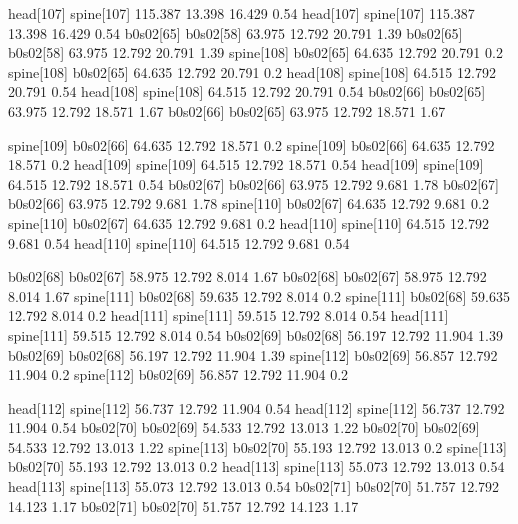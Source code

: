 head[107]    spine[107]    115.387    13.398    16.429    0.54
head[107]    spine[107]    115.387    13.398    16.429    0.54
b0s02[65]    b0s02[58]    63.975    12.792    20.791    1.39
b0s02[65]    b0s02[58]    63.975    12.792    20.791    1.39
spine[108]    b0s02[65]    64.635    12.792    20.791    0.2
spine[108]    b0s02[65]    64.635    12.792    20.791    0.2
head[108]    spine[108]    64.515    12.792    20.791    0.54
head[108]    spine[108]    64.515    12.792    20.791    0.54
b0s02[66]    b0s02[65]    63.975    12.792    18.571    1.67
b0s02[66]    b0s02[65]    63.975    12.792    18.571    1.67


spine[109]    b0s02[66]    64.635    12.792    18.571    0.2
spine[109]    b0s02[66]    64.635    12.792    18.571    0.2
head[109]    spine[109]    64.515    12.792    18.571    0.54
head[109]    spine[109]    64.515    12.792    18.571    0.54
b0s02[67]    b0s02[66]    63.975    12.792    9.681    1.78
b0s02[67]    b0s02[66]    63.975    12.792    9.681    1.78
spine[110]    b0s02[67]    64.635    12.792    9.681    0.2
spine[110]    b0s02[67]    64.635    12.792    9.681    0.2
head[110]    spine[110]    64.515    12.792    9.681    0.54
head[110]    spine[110]    64.515    12.792    9.681    0.54


b0s02[68]    b0s02[67]    58.975    12.792    8.014    1.67
b0s02[68]    b0s02[67]    58.975    12.792    8.014    1.67
spine[111]    b0s02[68]    59.635    12.792    8.014    0.2
spine[111]    b0s02[68]    59.635    12.792    8.014    0.2
head[111]    spine[111]    59.515    12.792    8.014    0.54
head[111]    spine[111]    59.515    12.792    8.014    0.54
b0s02[69]    b0s02[68]    56.197    12.792    11.904    1.39
b0s02[69]    b0s02[68]    56.197    12.792    11.904    1.39
spine[112]    b0s02[69]    56.857    12.792    11.904    0.2
spine[112]    b0s02[69]    56.857    12.792    11.904    0.2


head[112]    spine[112]    56.737    12.792    11.904    0.54
head[112]    spine[112]    56.737    12.792    11.904    0.54
b0s02[70]    b0s02[69]    54.533    12.792    13.013    1.22
b0s02[70]    b0s02[69]    54.533    12.792    13.013    1.22
spine[113]    b0s02[70]    55.193    12.792    13.013    0.2
spine[113]    b0s02[70]    55.193    12.792    13.013    0.2
head[113]    spine[113]    55.073    12.792    13.013    0.54
head[113]    spine[113]    55.073    12.792    13.013    0.54
b0s02[71]    b0s02[70]    51.757    12.792    14.123    1.17
b0s02[71]    b0s02[70]    51.757    12.792    14.123    1.17


